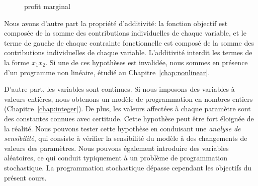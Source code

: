 \begin{figure}[htbp]
\begin{center}
\end{center}
\caption{profit marginal}
\label{fig:profit}
\end{figure}
Nous avons d'autre part la propriété d'additivité: la fonction objectif est composée de la somme des contributions individuelles de chaque variable, et le terme de gauche de chaque contrainte fonctionnelle est composé de la somme des contributions individuelles de chaque variable.
L'additivité interdit les termes de la forme $x_1x_2$.
Si une de ces hypothèses est invalidée, nous sommes en présence d'un programme non linéaire, étudié au Chapitre~\ref{chap:nonlinear}.

D'autre part, les variables sont continues. Si nous imposons des variables à valeurs entières, nous obtenons un modèle de programmation en nombres entiers (Chapitre~\ref{chap:integer}).
De plus, les valeurs affectées à chaque paramètre sont des constantes connues avec certitude.
Cette hypothèse peut être fort éloignée de la réalité.
Nous pouvons tester cette hypothèse en conduisant une {\sl analyse de sensibilité}, qui consiste à vérifier la sensibilité du modèle à des changements de valeurs des paramètres.
Nous pouvons également introduire des variables aléatoires, ce qui conduit typiquement à un problème de programmation stochastique.
La programmation stochastique dépasse cependant les objectifs du présent cours.

